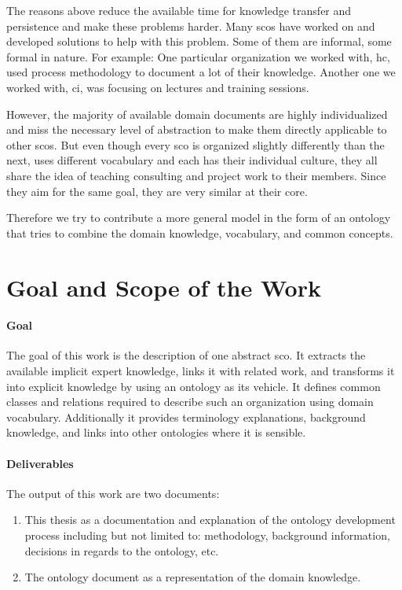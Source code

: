 \documentclass[a4paper, DIV=13, BCOR=0cm]{scrbook}
\begin{document}
The reasons above reduce the available time for knowledge transfer and persistence and make these problems harder. Many \glspl{sco} have worked on and developed solutions to help with this problem. Some of them are informal, some formal in nature. For example: One particular organization we worked with, \gls{hc}, used process methodology to document a lot of their knowledge. Another one we worked with, \gls{ci}, was focusing on lectures and training sessions.

However, the majority of available domain documents are highly individualized and miss the necessary level of abstraction to make them directly applicable to other \glspl{sco}. But even though every \gls{sco} is organized slightly differently than the next, uses different vocabulary and each has their individual culture, they all share the idea of teaching consulting and project work to their members. Since they aim for the same goal, they are very similar at their core.

Therefore we try to contribute a more general model in the form of an ontology that tries to combine the domain knowledge, vocabulary, and common concepts.

\section{Goal and Scope of the Work }
\label{goal}
\paragraph{Goal}
The goal of this work is the description of one abstract \gls{sco}. It extracts the available implicit expert knowledge, links it with related work, and transforms it into explicit  knowledge by using an ontology as its vehicle. It defines common classes and relations required to describe such an organization using domain vocabulary. Additionally it provides terminology explanations, background knowledge, and links into other ontologies where it is sensible.

\paragraph{Deliverables }
The output of this work are two documents:
\begin{enumerate}
	\item This thesis as a documentation and explanation of the ontology development process including but not limited to: methodology, background information, decisions in regards to the ontology, etc.
	\item The ontology document as a representation of the domain knowledge.
\end{enumerate}
\end{document}
